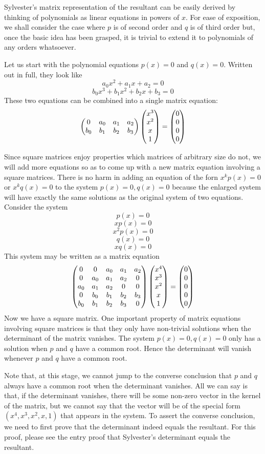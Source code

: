 \documentclass[12pt]{article}
\begin{document}
Sylvester's matrix representation of the resultant can be easily derived by thinking of polynomials as linear equations in powers of $x$.  For ease of exposition, we shall consider the case where $p$ is of second order and $q$ is of third order but, once the basic idea has been grasped, it is trivial to extend it to polynomials of any orders whatsoever.

Let us start with the polynomial equations $p(x) = 0$ and $q(x) = 0$.  Written out in full, they look like
 $$a_0 x^2 + a_1 x + a_2 = 0$$
 $$b_0 x^3 + b_1 x^2 + b_2 x + b_3 = 0$$
These two equations can be combined into a single matrix equation:
 $$\begin{pmatrix} 0 & a_0 & a_1 & a_2 \cr
 b_0 & b_1 & b_2 & b_3 \cr
 \end {pmatrix} \begin {pmatrix}
 x^3 \cr x^2 \cr x \cr 1 \cr
 \end {pmatrix} = \begin {pmatrix}
 0 \cr 0 \cr 0 \cr 0 \cr \end{pmatrix}$$

Since square matrices enjoy properties which matrices of arbitrary size do not, we will add more equations so as to come up with a new matrix equation involving a square matrices.  There is no harm in adding an equation of the forn $x^k p(x) = 0$ or $x^k q(x) = 0$ to the system $p(x) = 0, q(x) = 0$ because the enlarged system will have exactly the same solutions as the original system of two equations.  Consider the system
 $$p(x) = 0$$
 $$x p(x) = 0$$
 $$x^2 p(x) = 0$$
 $$q(x) = 0$$
 $$x q(x) = 0$$
This system may be written as a matrix equation
 $$\begin{pmatrix} 0 & 0 & a_0 & a_1 & a_2 \cr
 0 & a_0 & a_1 & a_2 & 0 \cr
 a_0 & a_1 & a_2 & 0 & 0 \cr
 0 & b_0 & b_1 & b_2 & b_3 \cr
 b_0 & b_1 & b_2 & b_3 & 0 \cr
 \end {pmatrix} \begin {pmatrix}
 x^4 \cr x^3 \cr x^2 \cr x \cr 1 \cr
 \end {pmatrix} = \begin {pmatrix}
 0 \cr 0 \cr 0 \cr 0 \cr 0 \cr \end{pmatrix}$$
Now we have a square matrix.  One important property of matrix equations involving square matrices is that they only have non-trivial solutions when the determinant of the matrix vanishes.  The system $p(x) = 0, q(x) = 0$ only has a solution when $p$ and $q$ have a common root.  Hence the determinant will vanish whenever $p$ and $q$ have a common root.

Note that, at this stage, we cannot jump to the converse conclusion that $p$ and $q$ always have a common root when the determinant vanishes.  All we can say is that, if the determinant vanishes, there will be some non-zero vector in the kernel of the matrix, but we cannot say that the vector will be of the special form $(x^4, x^3, x^2, x, 1)$ that appears in the system.  To assert the converse conclusion, we need to first prove that the determinant indeed equals the resultant.  For this proof, please see the entry proof that Sylvester's determinant equals the resultant.
\end{document}
